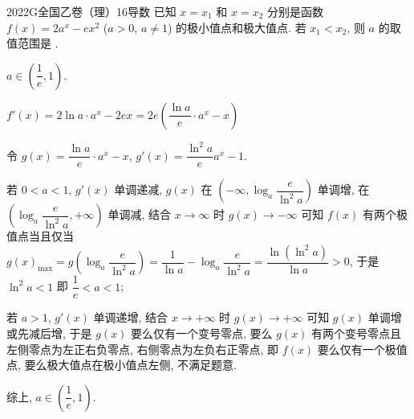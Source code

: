 
\begin{problem}{2022}{G}{全国乙卷（理）}{16}{导数}
已知 $ x = x_1 $ 和 $ x = x_2 $ 分别是函数 $ f(x) = 2a^x - ex^2 $ ($ a > 0 $, $ a \ne 1 $) 的极小值点和极大值点. 若 $ x_1 < x_2 $, 则 $ a $ 的取值范围是 \underline{\hspace{4em}}.
\end{problem}

\begin{answer}
$ a \in \left( \dfrac{1}{e}, 1 \right) $.
\end{answer}

\begin{solutions}
$ f'(x) = 2\ln a \cdot a^x - 2ex = 2e \left( \dfrac{\ln a}{e} \cdot a^x - x \right) $

令 $ g(x) = \dfrac{\ln a}{e} \cdot a^x - x $, $ g'(x) = \dfrac{\ln^2 a}{e} a^x - 1 $.

若 $ 0 < a < 1 $, $ g'(x) $ 单调递减, $ g(x) $ 在 $ \left( -\infty, \log_a \dfrac{e}{\ln^2 a} \right) $ 单调增, 在 $ \left( \log_a \dfrac{e}{\ln^2 a}, +\infty \right) $ 单调减, 结合 $ x \to \infty $ 时 $ g(x) \to -\infty $ 可知 $ f(x) $ 有两个极值点当且仅当 $ g(x)_{\max} = g\left( \log_a \dfrac{e}{\ln^2 a} \right) = \dfrac{1}{\ln a} - \log_a \dfrac{e}{\ln^2 a} = \dfrac{\ln(\ln^2 a)}{\ln a} > 0 $, 于是 $ \ln^2 a < 1 $ 即 $ \dfrac{1}{e} < a < 1 $;

若 $ a > 1 $, $ g'(x) $ 单调递增, 结合 $ x \to +\infty $ 时 $ g(x) \to +\infty $ 可知 $ g(x) $ 单调增或先减后增, 于是 $ g(x) $ 要么仅有一个变号零点, 要么 $ g(x) $ 有两个变号零点且左侧零点为左正右负零点, 右侧零点为左负右正零点, 即 $ f(x) $ 要么仅有一个极值点, 要么极大值点在极小值点左侧, 不满足题意.

综上, $ a \in \left( \dfrac{1}{e}, 1 \right) $.
\end{solutions}